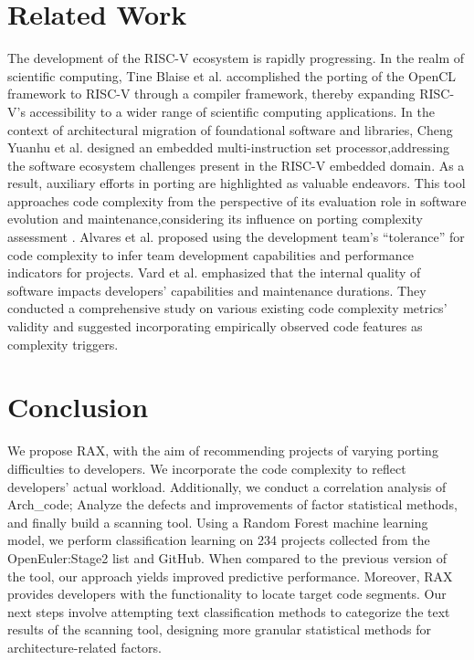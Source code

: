 \documentclass[sigconf,screen,review,anonymous]{acmart}
\begin{document}
\section{Related Work}
The development of the RISC-V ecosystem is rapidly progressing.
In the realm of scientific computing, Tine Blaise et al. \cite{osti_1830102} accomplished the porting of the OpenCL framework to RISC-V through a compiler framework, thereby expanding RISC-V's accessibility to a wider range of scientific computing applications.
In the context of architectural migration of foundational software and libraries, Cheng Yuanhu et al. \cite{2017Slow} designed an embedded multi-instruction set processor,addressing the software ecosystem challenges present in the RISC-V embedded domain.
As a result, auxiliary efforts in porting are highlighted as valuable endeavors.
This tool approaches code complexity from the perspective of its evaluation role in software evolution and maintenance,considering its influence on porting complexity assessment \cite{1993Software}.
Alvares et al. \cite{7844689} proposed using the development team's ``tolerance'' for code complexity to infer team development capabilities and performance indicators for projects.
Vard et al. \cite{2017Evaluating} emphasized that the internal quality of software impacts developers' capabilities and maintenance durations.
They conducted a comprehensive study on various existing code complexity metrics' validity and suggested incorporating empirically observed code features as complexity triggers.

\section{Conclusion}
We propose RAX, with the aim of recommending projects of varying porting difficulties to developers.
We incorporate the code complexity to reflect developers' actual workload.
Additionally, we conduct a correlation analysis of Arch\_code; Analyze the defects and improvements of factor statistical methods, and finally build a scanning tool.
Using a Random Forest machine learning model, we perform classification learning on 234 projects collected from the OpenEuler:Stage2 list and GitHub.
When compared to the previous version of the tool, our approach yields improved predictive performance.
Moreover, RAX provides developers with the functionality to locate target code segments.
Our next steps involve attempting text classification methods to categorize the text results of the scanning tool, designing more granular statistical methods for architecture-related factors.
\end{document}
